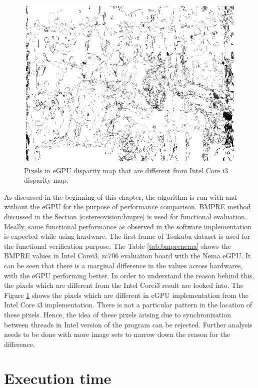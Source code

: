 \begin{figure}
    \center
    \includegraphics[width=.7\linewidth]{figures/diffpixeGPU}
    \caption{Pixels in eGPU disparity map that are different from Intel Core i3 disparity map.}
    \label{fig:diffpixegpu}
\end{figure}
As discussed in the beginning of this chapter, the algorithm is run with and without the eGPU for the purpose of performance comparison. BMPRE method discussed in the Section \ref{s:stereovision:bmpre} is used for functional evaluation. Ideally, same functional performance as observed in the software implementation is expected while using hardware. The first frame of Tsukuba dataset is used for the functional verification purpose. The Table \ref{tab:bmprenema} shows the BMPRE values in Intel Corei3, zc706 evaluation board with the Nema eGPU. It can be seen that there is a marginal difference in the values across hardwares, with the eGPU performing better. In order to understand the reason behind this, the pixels which are different from the Intel Corei3 result are looked into. The Figure \ref{fig:diffpixegpu} shows the pixels which are different in eGPU implementation from the Intel Core i3 implementation. There is not a particular pattern in the location of these pixels. Hence, the idea of these pixels arising due to synchronization between threads in Intel version of the program can be rejected. Further analysis needs to be done with more image sets to narrow down the reason for the difference.

\section{Execution time}
\label{sec:rtperformance}

